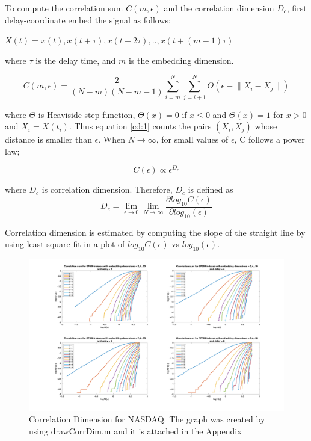 To compute the correlation sum $C(m,\epsilon)$ and the correlation dimension $D_c$, first delay-coordinate embed the signal as follows:


$X(t) = {x(t), x(t+\tau), x(t+2\tau),..,x(t+(m-1)\tau)}$

where $\tau$ is the delay time, and $m$ is the embedding dimension. 

\begin{equation} \label{cd:1}
C(m,\epsilon) = \frac{2}{(N-m)(N-m-1)} \sum_{i=m}^{N}\sum_{j=i+1}^{N} \Theta (\epsilon - \lVert X_i - X_j \rVert )
\end{equation}

where $\Theta$ is Heaviside step function, $\Theta(x) = 0$ if $x \le 0 $ and $\Theta(x) = 1$ for $x>0$ and $X_i = X(t_i)$.
Thus equation \ref{cd:1} counts the pairs $(X_i,X_j)$ whose distance is smaller than $\epsilon$.  When ${N\to\infty}$, for small values of $\epsilon$, C follows a power law;

\begin{equation} \label{cd:2}
C(\epsilon) \propto \epsilon^{D_c}
\end{equation}

where $D_c$ is correlation dimension. Therefore, $D_c$ is defined as
\begin{equation} \label{cd:3}
D_c = \lim_{\epsilon\to 0} \lim_{N\to\infty} \frac{\partial log_{10} C(\epsilon)}{\partial log_{10}(\epsilon)}
\end{equation}

Correlation dimension is estimated by computing the slope of the straight line by using least square fit in a plot of $log_{10} C(\epsilon)$ vs $log_{10}(\epsilon)$.

\begin{figure}[!ht]
\includegraphics[scale=.15]{Images/SP500CD1}
\caption{Correlation Dimension for NASDAQ. The graph was created by using drawCorrDim.m and it is attached in the Appendix}
\label{fig:SP500CD1}
\end{figure}

